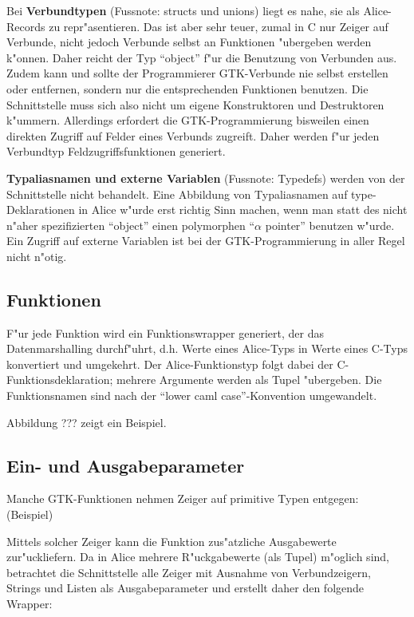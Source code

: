 \documentclass{article}
\begin{document}
Bei \textbf{Verbundtypen} (Fussnote: structs und unions) liegt es nahe, sie
als Alice-Records zu repr"asentieren. Das ist aber sehr teuer, zumal in C
nur Zeiger auf Verbunde, nicht jedoch Verbunde selbst
an Funktionen "ubergeben werden k"onnen.
Daher reicht der Typ ``object'' f"ur die Benutzung von Verbunden aus.
Zudem kann und sollte der Programmierer GTK-Verbunde nie selbst
erstellen oder entfernen, sondern nur die entsprechenden Funktionen benutzen.
Die Schnittstelle muss sich also nicht um eigene Konstruktoren und Destruktoren
k"ummern. Allerdings erfordert die GTK-Programmierung bisweilen einen direkten
Zugriff auf Felder eines Verbunds zugreift. Daher werden f"ur jeden
Verbundtyp Feldzugriffsfunktionen generiert.

\textbf{Typaliasnamen und externe Variablen} (Fussnote: Typedefs) werden von
der Schnittstelle nicht behandelt. Eine Abbildung von Typaliasnamen auf
type-Deklarationen in Alice w"urde erst richtig Sinn machen, wenn man
statt des nicht n"aher spezifizierten ``object'' einen polymorphen
``$\alpha$ pointer'' benutzen w"urde. Ein Zugriff auf externe Variablen
ist bei der GTK-Programmierung in aller Regel nicht n"otig.

\subsection{Funktionen}

F"ur jede Funktion wird ein Funktionswrapper generiert, der das
Datenmarshalling durchf"uhrt, d.h. Werte eines Alice-Typs in Werte eines
C-Typs konvertiert und umgekehrt. Der Alice-Funktionstyp folgt dabei der
C-Funktionsdeklaration; mehrere Argumente werden als Tupel "ubergeben.
Die Funktionsnamen sind nach der ``lower caml case''-Konvention
umgewandelt.

Abbildung ??? zeigt ein Beispiel.

\subsection{Ein- und Ausgabeparameter}

Manche GTK-Funktionen nehmen Zeiger auf primitive Typen entgegen:
(Beispiel)

Mittels solcher Zeiger kann die Funktion zus"atzliche Ausgabewerte
zur"uckliefern. Da in Alice mehrere R"uckgabewerte (als Tupel) m"oglich sind,
betrachtet die Schnittstelle alle Zeiger mit Ausnahme von Verbundzeigern,
Strings und Listen als Ausgabeparameter und erstellt daher den folgende
Wrapper:
\end{document}
